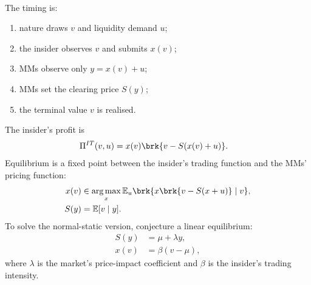 \begin{model}
\par\smallskip\noindent{}\\
The timing is:
\begin{enumerate}[label=\roman*.]
\setlength{\itemsep}{0pt}
\item nature draws $v$ and liquidity demand $u$;
\item the insider observes $v$ and submits $x(v)$;
\item MMs observe only $y=x(v)+u$;
\item MMs set the clearing price $S(y)$;
\item the terminal value $v$ is realised.
\end{enumerate}
The insider's profit is
\begin{align*}
\Pi^{IT}(v,u)&=x(v)\brk{v-S(x(v)+u)}.
\end{align*}
Equilibrium is a fixed point between the insider's trading function and the MMs' pricing function:
\begin{align*}
x(v)&\in\operatorname*{arg\,max}_{x}\mathbb{E}_u\brk{x\brk{v-S(x+u)}\mid v},\\
S(y)&=\mathbb{E}[v\mid y].
\end{align*}
To solve the normal-static version, conjecture a linear equilibrium:
\begin{align*}
S(y)&=\mu+\lambda y,\\
x(v)&=\beta(v-\mu),
\end{align*}
where $\lambda$ is the market's price-impact coefficient and $\beta$ is the insider's trading intensity.


\end{model}
